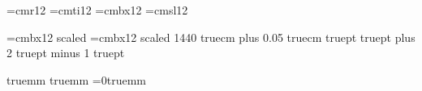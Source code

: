 \def\verbatim{\begingroup\setupverbatim\doverbatim}
\def\doverbatim#1{\def\next##1#1{##1\endgroup}\next}

\def\th{\thinspace}
\def\pagenumbers{\footline={\hss\tenrm\folio\hss}}
\font\twelverm=cmr12
\font\twelveit=cmti12
\font\twelvebf=cmbx12
\font\twelvesl=cmsl12

\font\big=cmbx12 scaled\magstephalf
\font\Big=cmbx12 scaled 1440
 truecm plus 0.05 truecm		%
 truept				%
\hfuzz=1pt
 truept plus 2 truept minus 1 truept	%

 truemm				%
 truemm				%
\parindent=0truemm
\mathsurround=0pt

